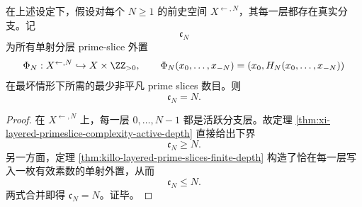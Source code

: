 \begin{corollary}\label{cor:xi-time-part74-finite-past-primeslice-complexity-depth}
在上述设定下，假设对每个 \(N\ge 1\) 的前史空间 \(X^{\leftarrow,N}\)，其每一层都存在真实分支。记
\[
\mathfrak c_N
\]
为所有单射分层 prime-slice 外置
\[
\Phi_N:X^{\leftarrow,N}\hookrightarrow X\times \ZZ_{>0},
\qquad
\Phi_N(x_0,\dots,x_{-N})=(x_0,H_N(x_0,\dots,x_{-N}))
\]
在最坏情形下所需的最少非平凡 prime slices 数目。则
\[
\boxed{\;
\mathfrak c_N=N.\;}
\]
\end{corollary}
\begin{proof}
在 \(X^{\leftarrow,N}\) 上，每一层 \(0,\dots,N-1\) 都是活跃分支层。故定理 \ref{thm:xi-layered-primeslice-complexity-active-depth} 直接给出下界
\[
\mathfrak c_N\ge N.
\]
另一方面，定理 \ref{thm:killo-layered-prime-slices-finite-depth} 构造了恰在每一层写入一枚有效素数的单射外置，从而
\[
\mathfrak c_N\le N.
\]
两式合并即得 \(\mathfrak c_N=N\)。证毕。
\end{proof}

